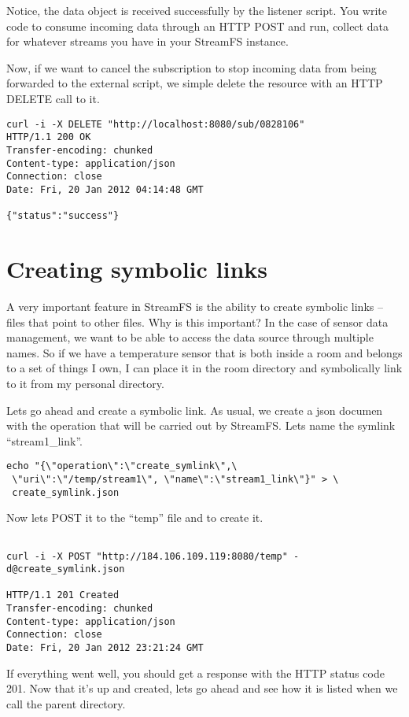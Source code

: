 Notice, the data object is received successfully by the listener script. You write code to consume incoming data through an HTTP POST and run, collect data for whatever streams you have in your StreamFS instance.

Now, if we want to cancel the subscription to stop incoming data from being forwarded to the external script, we simple delete the resource with an HTTP DELETE call to it.

\begin{lstlisting}
curl -i -X DELETE "http://localhost:8080/sub/0828106"
HTTP/1.1 200 OK
Transfer-encoding: chunked
Content-type: application/json
Connection: close
Date: Fri, 20 Jan 2012 04:14:48 GMT

{"status":"success"}
\end{lstlisting}

\section{Creating symbolic links}

A very important feature in StreamFS is the ability to create symbolic links -- files that point to other files. Why is this important? In the case of sensor data management, we want to be able to access the data source through multiple names. So if we have a temperature sensor that is both inside a room and belongs to a set of things I own, I can place it in the room directory and symbolically link to it from my personal directory.

Lets go ahead and create a symbolic link. As usual, we create a json documen with the operation that will be carried out by StreamFS. Lets name the symlink ``stream1\_link''.

\begin{lstlisting}
echo "{\"operation\":\"create_symlink\",\
 \"uri\":\"/temp/stream1\", \"name\":\"stream1_link\"}" > \
 create_symlink.json
\end{lstlisting}
Now lets POST it to the ``temp'' file and to create it.

\begin{lstlisting}

curl -i -X POST "http://184.106.109.119:8080/temp" -d@create_symlink.json 

HTTP/1.1 201 Created
Transfer-encoding: chunked
Content-type: application/json
Connection: close
Date: Fri, 20 Jan 2012 23:21:24 GMT
\end{lstlisting}

If everything went well, you should get a response with the HTTP status code 201. Now that it's up and created, lets go ahead and see how it is listed when we call the parent directory.

